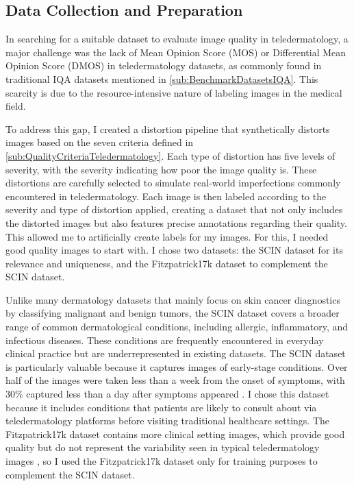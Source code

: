 \subsection{Data Collection and Preparation} 
\label{sub:DataCollection}
In searching for a suitable dataset to evaluate image quality in teledermatology, a major challenge was the lack of Mean Opinion Score (MOS) or Differential Mean Opinion Score (DMOS) in teledermatology datasets, as commonly found in traditional IQA datasets mentioned in \autoref{sub:BenchmarkDatasetsIQA}. This scarcity is due to the resource-intensive nature of labeling images in the medical field. \par
\vspace{\baselineskip}
\noindent
To address this gap, I created a distortion pipeline that synthetically distorts images based on the seven criteria defined in \autoref{sub:QualityCriteriaTeledermatology}. Each type of distortion has five levels of severity, with the severity indicating how poor the image quality is. These distortions are carefully selected to simulate real-world imperfections commonly encountered in teledermatology. Each image is then labeled according to the severity and type of distortion applied, creating a dataset that not only includes the distorted images but also features precise annotations regarding their quality. This allowed me to artificially create labels for my images. For this, I needed good quality images to start with. I chose two datasets: the SCIN dataset for its relevance and uniqueness, and the Fitzpatrick17k dataset to complement the SCIN dataset. \par
\vspace{\baselineskip}
\noindent
Unlike many dermatology datasets that mainly focus on skin cancer diagnostics by classifying malignant and benign tumors, the SCIN dataset covers a broader range of common dermatological conditions, including allergic, inflammatory, and infectious diseases. These conditions are frequently encountered in everyday clinical practice but are underrepresented in existing datasets. The SCIN dataset is particularly valuable because it captures images of early-stage conditions. Over half of the images were taken less than a week from the onset of symptoms, with 30\% captured less than a day after symptoms appeared \autocite{SCIN}.  I chose this dataset because it includes conditions that patients are likely to consult about via teledermatology platforms before visiting traditional healthcare settings. The Fitzpatrick17k dataset contains more clinical setting images, which provide good quality but do not represent the variability seen in typical teledermatology images \autocite{F17K}, so I used the Fitzpatrick17k dataset only for training purposes to complement the SCIN dataset. \par 
